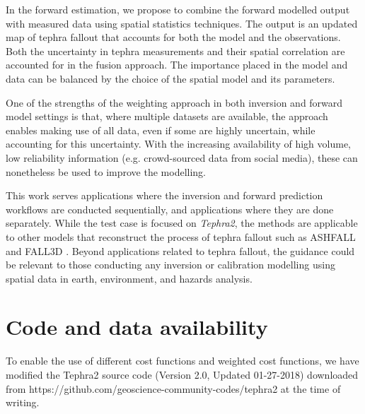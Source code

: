 \documentclass[a4paper,fleqn]{cas-sc}
\begin{document}
In the forward estimation, we propose to combine the forward modelled output with measured data using spatial statistics techniques. The output is an updated map of tephra fallout that accounts for both the model and the observations. Both the uncertainty in tephra measurements and their spatial correlation are accounted for in the fusion approach. The importance placed in the model and data can be balanced by the choice of the spatial model and its parameters. 

One of the strengths of the weighting approach in both inversion and forward model settings is that, where multiple datasets are available, the approach enables making use of all data, even if some are highly uncertain, while accounting for this uncertainty. With the increasing availability of high volume, low reliability information (e.g. crowd-sourced data from social media), these can nonetheless be used to improve the modelling. 

This work serves applications where the inversion and forward prediction workflows are conducted sequentially, and applications where they are done separately. While the test case is focused on \textit{Tephra2}, the methods are applicable to other models that reconstruct the process of tephra fallout such as ASHFALL and FALL3D \citep{hurst1999performance, folch2009fall3d}. Beyond applications related to tephra fallout, the guidance could be relevant to those conducting any inversion or calibration modelling using spatial data in earth, environment, and hazards analysis.

\section*{Code and data availability}
To enable the use of different cost functions and weighted cost functions, we have modified the Tephra2 source code (Version 2.0, Updated 01-27-2018) downloaded from https://github.com/geoscience-community-codes/tephra2 at the time of writing.
\end{document}
